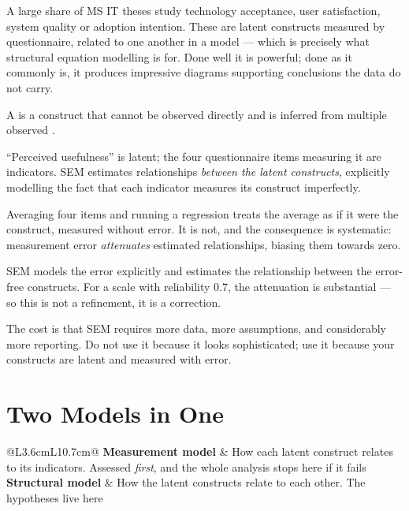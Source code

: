A large share of MS IT theses study technology acceptance, user satisfaction,
system quality or adoption intention. These are latent constructs measured by
questionnaire, related to one another in a model --- which is precisely what
structural equation modelling is for. Done well it is powerful; done as it
commonly is, it produces impressive diagrams supporting conclusions the data do
not carry.

\begin{definitionbox}
A  is a construct that cannot be observed directly and is
inferred from multiple observed .

\medskip
``Perceived usefulness'' is latent; the four questionnaire items measuring it
are indicators. SEM estimates relationships \emph{between the latent
constructs}, explicitly modelling the fact that each indicator measures its
construct imperfectly.
\end{definitionbox}

\begin{conceptbox}
Averaging four items and running a regression treats the average as if it were
the construct, measured without error. It is not, and the consequence is
systematic: measurement error \emph{attenuates} estimated relationships, biasing
them towards zero.

\medskip
SEM models the error explicitly and estimates the relationship between the
error-free constructs. For a scale with reliability 0.7, the attenuation is
substantial --- so this is not a refinement, it is a correction.

\medskip
The cost is that SEM requires more data, more assumptions, and considerably
more reporting. Do not use it because it looks sophisticated; use it because
your constructs are latent and measured with error.
\end{conceptbox}

\section{Two Models in One}

\begin{center}
\small
\begin{tabular}{@{}L{3.6cm}L{10.7cm}@{}}
\toprule
\textbf{Measurement model} & How each latent construct relates to its
                             indicators. Assessed \emph{first}, and the whole
                             analysis stops here if it fails \\
\textbf{Structural model}  & How the latent constructs relate to each other.
                             The hypotheses live here \\
\bottomrule
\end{tabular}
\end{center}

